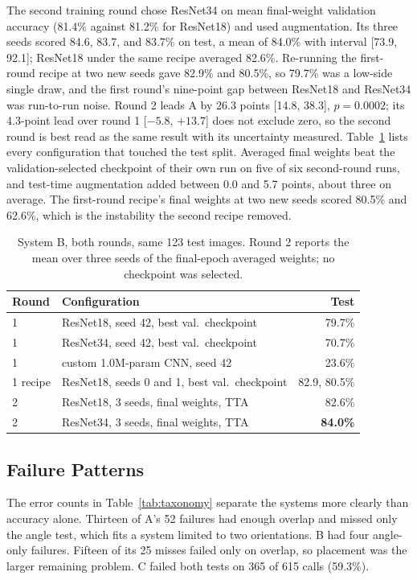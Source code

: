 \documentclass[10pt,conference]{IEEEtran}
\begin{document}
The second training round chose ResNet34 on mean final-weight validation
accuracy (81.4\% against 81.2\% for ResNet18) and used augmentation. Its
three seeds scored 84.6, 83.7, and 83.7\% on test, a mean of 84.0\% with
interval [73.9, 92.1]; ResNet18 under the same recipe averaged 82.6\%.
Re-running the first-round recipe at two new seeds gave 82.9\% and 80.5\%,
so 79.7\% was a low-side single draw, and the first round's nine-point gap
between ResNet18 and ResNet34 was run-to-run noise. Round 2 leads A by 26.3
points [14.8, 38.3], $p=0.0002$; its 4.3-point lead over round 1
[$-5.8$, $+13.7$] does not exclude zero, so the second round is best read
as the same result with its uncertainty measured. Table~\ref{tab:round2}
lists every configuration that touched the test split. Averaged final
weights beat the validation-selected checkpoint of their own run on five
of six second-round runs, and test-time augmentation added between 0.0 and
5.7 points, about three on average. The first-round recipe's final weights
at two new seeds scored 80.5\% and 62.6\%, which is the instability the
second recipe removed.

\begin{table}[t]
\caption{System B, both rounds, same 123 test images. Round 2 reports the
mean over three seeds of the final-epoch averaged weights; no checkpoint
was selected.}
\label{tab:round2}
\centering
\footnotesize
\begin{tabular}{llr}
\toprule
Round & Configuration & Test \\
\midrule
1 & ResNet18, seed 42, best val.\ checkpoint & 79.7\% \\
1 & ResNet34, seed 42, best val.\ checkpoint & 70.7\% \\
1 & custom 1.0M-param CNN, seed 42 & 23.6\% \\
1 recipe & ResNet18, seeds 0 and 1, best val.\ checkpoint & 82.9, 80.5\% \\
2 & ResNet18, 3 seeds, final weights, TTA & 82.6\% \\
2 & ResNet34, 3 seeds, final weights, TTA & \textbf{84.0\%} \\
\bottomrule
\end{tabular}
\end{table}

\subsection{Failure Patterns}

The error counts in Table~\ref{tab:taxonomy} separate the systems more clearly
than accuracy alone. Thirteen of A's 52 failures had enough overlap and missed
only the angle test, which fits a system limited to two orientations. B had
four angle-only failures. Fifteen of its 25 misses failed only on overlap, so
placement was the larger remaining problem. C failed both tests on 365 of 615
calls (59.3\%).
\end{document}
